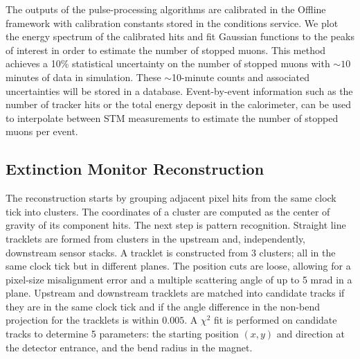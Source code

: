 The outputs of the pulse-processing algorithms are calibrated in the Offline framework with calibration constants stored in the conditions service. We plot the energy spectrum of the calibrated hits and fit Gaussian functions to the peaks of interest in order to estimate the number of stopped muons. This method achieves a 10\% statistical uncertainty on the number of stopped muons with $\sim 10$ minutes of data in simulation. These $\sim$10-minute counts and associated uncertainties will be stored in a database. Event-by-event information such as the number of tracker hits or the total energy deposit in the calorimeter, can be used to interpolate between STM measurements to estimate the number of stopped muons per event.

\subsection{Extinction Monitor Reconstruction}

The reconstruction starts by grouping adjacent pixel hits from the same clock tick into clusters. The coordinates of a cluster are computed as the center of gravity of its component hits. The next step is pattern recognition. Straight line tracklets are formed from clusters in the upstream and, independently, downstream sensor stacks. A tracklet is constructed from 3 clusters; all in the same clock tick but in different planes. The position cuts are loose, allowing for a pixel-size misalignment error and a multiple scattering angle of up to 5 mrad in a plane. Upstream and downstream tracklets are matched into candidate tracks if they are in the same clock tick and if the angle difference in the non-bend projection for the tracklets is within $0.005$. A $\chi^2$ fit is performed on candidate tracks to determine 5 parameters: the starting position $(x,y)$ and direction at the detector entrance, and the bend radius in the magnet. 

